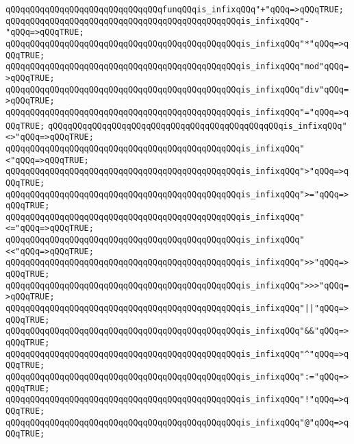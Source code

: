 \verb|qQQqqQQqqQQqqQQqqQQqqQQqqQQqqQQqfunqQQqis_infixqQQq"+"qQQq=>qQQqTRUE;|\newline
\verb|qQQqqQQqqQQqqQQqqQQqqQQqqQQqqQQqqQQqqQQqqQQqqQQqis_infixqQQq"-"qQQq=>qQQqTRUE;|\newline
\verb|qQQqqQQqqQQqqQQqqQQqqQQqqQQqqQQqqQQqqQQqqQQqqQQqis_infixqQQq"*"qQQq=>qQQqTRUE;|\newline
\verb|qQQqqQQqqQQqqQQqqQQqqQQqqQQqqQQqqQQqqQQqqQQqqQQqis_infixqQQq"mod"qQQq=>qQQqTRUE;|\newline
\verb|qQQqqQQqqQQqqQQqqQQqqQQqqQQqqQQqqQQqqQQqqQQqqQQqis_infixqQQq"div"qQQq=>qQQqTRUE;|\newline
\verb|qQQqqQQqqQQqqQQqqQQqqQQqqQQqqQQqqQQqqQQqqQQqqQQqis_infixqQQq"="qQQq=>qQQqTRUE;|\newline
\verb|qQQqqQQqqQQqqQQqqQQqqQQqqQQqqQQqqQQqqQQqqQQqqQQqis_infixqQQq"<>"qQQq=>qQQqTRUE;|\newline
\verb|qQQqqQQqqQQqqQQqqQQqqQQqqQQqqQQqqQQqqQQqqQQqqQQqis_infixqQQq"<"qQQq=>qQQqTRUE;|\newline
\verb|qQQqqQQqqQQqqQQqqQQqqQQqqQQqqQQqqQQqqQQqqQQqqQQqis_infixqQQq">"qQQq=>qQQqTRUE;|\newline
\verb|qQQqqQQqqQQqqQQqqQQqqQQqqQQqqQQqqQQqqQQqqQQqqQQqis_infixqQQq">="qQQq=>qQQqTRUE;|\newline
\verb|qQQqqQQqqQQqqQQqqQQqqQQqqQQqqQQqqQQqqQQqqQQqqQQqis_infixqQQq"<="qQQq=>qQQqTRUE;|\newline
\verb|qQQqqQQqqQQqqQQqqQQqqQQqqQQqqQQqqQQqqQQqqQQqqQQqis_infixqQQq"<<"qQQq=>qQQqTRUE;|\newline
\verb|qQQqqQQqqQQqqQQqqQQqqQQqqQQqqQQqqQQqqQQqqQQqqQQqis_infixqQQq">>"qQQq=>qQQqTRUE;|\newline
\verb|qQQqqQQqqQQqqQQqqQQqqQQqqQQqqQQqqQQqqQQqqQQqqQQqis_infixqQQq">>>"qQQq=>qQQqTRUE;|\newline
\verb|qQQqqQQqqQQqqQQqqQQqqQQqqQQqqQQqqQQqqQQqqQQqqQQqis_infixqQQq"|\verb#||"qQQq=>qQQqTRUE;#\newline
\verb|qQQqqQQqqQQqqQQqqQQqqQQqqQQqqQQqqQQqqQQqqQQqqQQqis_infixqQQq"&&"qQQq=>qQQqTRUE;|\newline
\verb|qQQqqQQqqQQqqQQqqQQqqQQqqQQqqQQqqQQqqQQqqQQqqQQqis_infixqQQq"^"qQQq=>qQQqTRUE;|\newline
\verb|qQQqqQQqqQQqqQQqqQQqqQQqqQQqqQQqqQQqqQQqqQQqqQQqis_infixqQQq":="qQQq=>qQQqTRUE;|\newline
\verb|qQQqqQQqqQQqqQQqqQQqqQQqqQQqqQQqqQQqqQQqqQQqqQQqis_infixqQQq"!"qQQq=>qQQqTRUE;|\newline
\verb|qQQqqQQqqQQqqQQqqQQqqQQqqQQqqQQqqQQqqQQqqQQqqQQqis_infixqQQq"@"qQQq=>qQQqTRUE;|\newline
